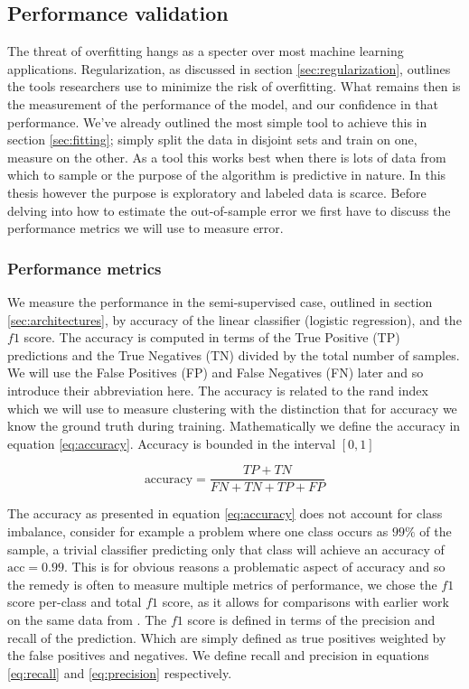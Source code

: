 \subsection{Performance validation}\label{sec:performance_val}

The threat of overfitting hangs as a specter over most machine learning applications. Regularization, as discussed in section \ref{sec:regularization}, outlines the tools researchers use to minimize the risk of overfitting. What remains then is the measurement of the performance of the model, and our confidence in that performance. We've already outlined the most simple tool to achieve this in section \ref{sec:fitting}; simply split the data in disjoint sets and train on one, measure on the other. As a tool this works best when there is lots of data from which to sample or the purpose of the algorithm is predictive in nature. In this thesis however the purpose is exploratory and labeled data is scarce. Before delving into how to estimate the out-of-sample error we first have to discuss the performance metrics we will use to measure error. 

\subsubsection{Performance metrics}

We measure the performance in the semi-supervised case, outlined in section \ref{sec:architectures}, by accuracy of the linear classifier (logistic regression), and the $f1$ score.  The accuracy is computed in terms of  the True Positive (TP) predictions and the True Negatives (TN) divided by the total number of samples. We will use the False Positives (FP) and False Negatives (FN) later and so introduce their abbreviation here. The accuracy is related to the rand index which we will use to measure clustering with the distinction that for accuracy we know the ground truth during training. Mathematically we define the accuracy in equation \ref{eq:accuracy}. Accuracy is bounded in the interval $[0, 1]$

\begin{equation}\label{eq:accuracy}
\text{accuracy} = \frac{TP + TN}{FN+ TN + TP+FP}
\end{equation}

\noindent The accuracy as presented in equation \ref{eq:accuracy} does not account for class imbalance, consider for example a problem where one class occurs as $99\%$ of the sample, a trivial classifier predicting only that class will achieve an accuracy of $\text{acc}=0.99$. This is for obvious reasons a problematic aspect of accuracy and so the remedy is often to measure multiple metrics of performance, we chose the $f1$ score per-class and total $f1$ score, as it allows for comparisons with earlier work on the same data from \citet{Kuchera2019}. The $f1$ score is defined in terms of the precision and recall of the prediction. Which are simply defined as true positives weighted by the false positives and negatives. We define recall and precision in equations \ref{eq:recall} and \ref{eq:precision} respectively.

